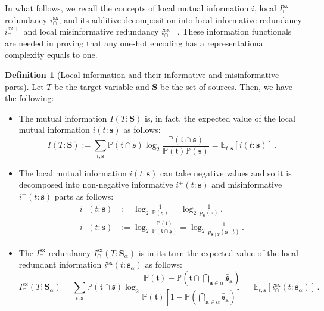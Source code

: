 \documentclass[10pt]{article}
\theoremstyle{definition}
\newtheorem{definition}{Definition}[section]
\theoremstyle{plain}
\begin{document}
In what follows, we recall the concepts of local mutual information $i$, local $I^{\mathrm{sx}}_\cap$ redundancy $i^{\mathrm{sx}}_\cap$, and its additive decomposition into local informative redundancy $i^{\mathrm{sx}+}_\cap$ and local misinformative redundancy $i^{\mathrm{sx}-}_\cap$. These information functionals are needed in proving that any one-hot encoding has a representational complexity equals to one.
\begin{definition}[Local information and their informative and misinformative parts]
    Let $T$ be the target variable and $\bm S$ be the set of sources. Then, we have the following:
    \begin{itemize}
        \item The mutual information $I(T: \bm S)$ is, in fact, the expected value of the local mutual information $i(t: \bm s )$ as follows: 
            $$I(T: \bm S) := \sum_{t, \bm{s}} \mathbb{P}(\mathfrak{t} \cap \bm{\mathfrak{s}})\log_2 \frac{\mathbb{P}\left(\mathfrak{t} \cap\bm{\mathfrak{s}}\right)}{\mathbb{P}\left(\mathfrak{t}\right)\mathbb{P}\left(\bm{\mathfrak{s}}\right)} = \mathbb E_{t,\bm s}\left[ i(t:\bm s)\right]\,.$$
        \item The local mutual information $i(t: \bm s)$ can take negative values and so it is  decomposed into non-negative informative $i^+(t: \bm s)$ and misinformative $i^-(t: \bm s)$ parts as follows:
            \begin{equation*}
                \begin{split}
                    i^+(t: \bm s) &:= \log_2\frac{1}{\mathbb{P}\left(\bm{\mathfrak{s}}\right)} = \log_2\frac{1}{p_{\bm S}(\bm s)}\,,\\
                    i^-(t: \bm s) &:= \log_2\frac{\mathbb{P}\left(\mathfrak{t}\right)}{\mathbb{P}\left(\mathfrak{t} \cap\bm{\mathfrak{s}}\right)} = \log_2\frac{1}{p_{\bm S\mid T}(\bm s\mid t)}\,.
                \end{split}
            \end{equation*}
        \item The $I^{\mathrm{sx}}_\cap$ redundancy $I^{\mathrm{sx}}_\cap(T: \bm S_\alpha)$ is in its turn the expected value of the local redundant information $i^{\mathrm{sx}}(t: \bm s_{\alpha} )$ as follows:
            $$ I^{\mathrm{sx}}_\cap(T:\bm S_\alpha) = \sum_{t, \bm{s}} \mathbb{P}(\mathfrak{t} \cap \bm{\mathfrak{s}})
            \log_2
            \frac{\mathbb{P}\left(\mathfrak{t}\right) - \mathbb{P}\left(\mathfrak{t} \cap \bigcap_{\bm{a}\in\alpha}\bm{\bar{\mathfrak{s}}}_{\bm{a}}\right)}{\mathbb{P}\left(\mathfrak{t}\right)\left[1 - \mathbb{P}\left(\bigcap_{\bm{a}\in \alpha}\bm{\bar{\mathfrak{s}}}_{\bm{a}}\right) \right]} = \mathbb E_{t,\bm s}\left[ i^{\mathrm{sx}}_\cap(t:\bm s_\alpha)\right]\,.$$

\end{itemize}
\end{definition}
\end{document}
